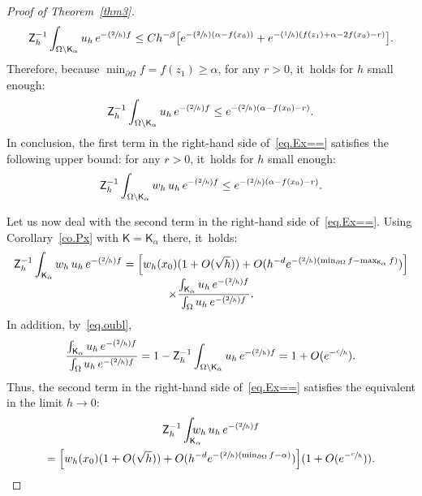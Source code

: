 \documentclass[JEP,XML,SOM,Unicode,NoEqCountersInSection,NoFloatCountersInSection,published]{cedram}
\newcommand{\Psfrac}[2]{(\sfrac{#1}{#2})}
\theoremstyle{plain}
\theoremstyle{definition}
\begin{document}
\begin{proof}[Proof of Theorem~\ref{thm3}]
\[
{\mathsf Z_h^{-1}}\int_{\Omega \setminus \mathsf K_{\alpha}}
{u}_h\, e^{-\Psfrac{2}{h}f}\le Ch^{-\beta} \big [ e^{-\Psfrac 2h (\alpha -f(x_0))}+ e^{-\Psfrac 1h (f(z_1)+\alpha -2f(x_0)-r)} \big].
\]
Therefore, because $\min_{\partial \Omega }f=f(z_1)\ge \alpha$, for any $r>0$, it~holds for $h$ small enough:\vspace*{-3pt}
\begin{equation}\label{eq.oubl}
{\mathsf Z_h^{-1}}\int_{\Omega \setminus \mathsf K_{\alpha}}
{u}_h\, e^{-\Psfrac{2}{h}f}\le e^{-\Psfrac 2h (\alpha -f(x_0)-r)}.
\end{equation}
In conclusion, the first term in the right-hand side of~\eqref{eq.Ex==} satisfies the following upper bound: for any $r>0$, it~holds for $h$ small enough:\vspace*{-3pt}
\begin{equation}\label{eq.Est1-EE2}
{\mathsf Z_h^{-1}} \int_{\Omega \setminus \mathsf K_{\alpha}}w_h\,
{u}_h\, e^{-\Psfrac{2}{h}f} \le e^{-\Psfrac 2h (\alpha -f(x_0)-r)}.
\end{equation}

Let us now deal with the second term in the right-hand side of~\eqref{eq.Ex==}. Using Corollary~\ref{co.Px} with $\mathsf K=\mathsf K_{\alpha}$ there, it~holds:\vspace*{-5pt}
\begin{multline*}
{\mathsf Z_h^{-1}} \int_{\mathsf K_{\alpha}} w_h\, {u}_h\,
e^{-\Psfrac{2}{h}f} = \Big[w_h(x_0)(1+O(\sqrt h))+ O(h^{-d}e^{-\Psfrac
2h (\min_{\partial \Omega }f-\max_{\mathsf K_{\alpha}} f)}) \Big]
\\[-5pt]
\times \frac{\int_{\mathsf K_{\alpha}} {u}_h\, e^{-\Psfrac{2}{h}f}
}{ \int_{\Omega} {u}_h\, e^{-\Psfrac{2}{h}f} }.
\end{multline*}
In addition, by~\eqref{eq.oubl},
\[
\frac{\int_{\mathsf K_{\alpha}} {u}_h\, e^{-\Psfrac{2}{h}f} }{ \int_{\Omega} {u}_h\, e^{-\Psfrac{2}{h}f} }=1- {\mathsf Z_h^{-1}}\int_{\Omega \setminus \mathsf K_{\alpha}}
{u}_h\, e^{-\Psfrac{2}{h}f}=1+O(e^{-\sfrac ch}).
\]
Thus, the second term in the right-hand side of~\eqref{eq.Ex==} satisfies the equivalent in the limit $h\to 0$:
\begin{multline}\label{eq.Est1-EE3}
{\mathsf Z_h^{-1}} \int_{\mathsf K_{\alpha}} \!\!\! \!\!\! w_h\, {u}_h\, e^{-\Psfrac{2}{h}f}\\
= \Big[w_h(x_0)(1+O(\sqrt h))+ O(h^{-d}e^{-\Psfrac 2h (\min_{\partial \Omega }f-\alpha)}) \Big] (1+O(e^{-\sfrac ch})).
\end{multline}


\end{proof}
\end{document}
